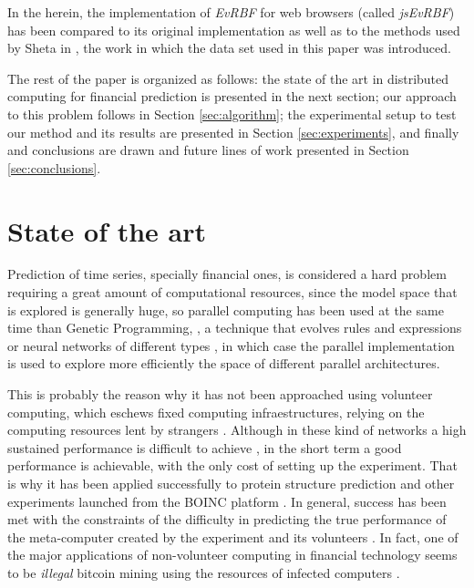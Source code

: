 \documentclass{article}
\begin{document}


In the herein, the implementation of {\em EvRBF} for web browsers
(called {\em jsEvRBF}) has been compared to its original
implementation as well as to the methods used by Sheta in
\cite{Sheta2001}, the work in which the data set used in this paper
was introduced.

The rest of the paper is organized as follows: the state of the art in
distributed computing for financial prediction is presented in the
next section; our approach to this problem follows in Section
\ref{sec:algorithm}; the experimental setup to test our method and its
results are presented in Section \ref{sec:experiments}, and finally
and conclusions are drawn and future
lines of work presented in Section \ref{sec:conclusions}.

\section{State of the art}

Prediction of time series, specially financial ones, is considered a
hard problem requiring a great amount of computational resources,
since the model space that is explored is generally huge, so parallel
computing has been used at the same time than Genetic Programming,
\cite{santini2001genetic}, a technique that evolves rules and
expressions or neural networks of different types \cite{niska2004evolving,Mora2010,DBLP:conf/iwann/ArenasPRCJG09,RIIACastillo2008}, in which case
the parallel implementation is used to explore more efficiently the
space of different parallel architectures.

This is probably the reason why it has not been approached using
volunteer computing, which eschews fixed computing infraestructures,
relying on the computing resources lent by strangers
\cite{daniel:euromicro09,gecco07:workshop:dcor,DBLP:journals/corr/abs-0801-1210,DBLP:conf/gecco/MereloCGCRV16,baratloo1996charlotte,hwang2009determinants,web:BOINC}. Although
in these kind of networks a high sustained performance is difficult to
achieve \cite{DBLP:conf/lion/LaredoGFMACG11}, in the short term a
  good performance is achievable, with the only cost of setting up the
  experiment. That is why it has been applied successfully to protein
  structure prediction \cite{taufer2006predictor} and other
  experiments launched from the BOINC platform \cite{boinc_grid04}. In
  general, success has been met with the constraints of the difficulty
  in predicting the true performance of the meta-computer created by
  the experiment and its volunteers \cite{Merelo2016}. In fact, one of
  the major applications of non-volunteer computing in financial
  technology seems to be {\em illegal} bitcoin mining using the
  resources of infected computers \cite{plohmann2012case}.
\end{document}
